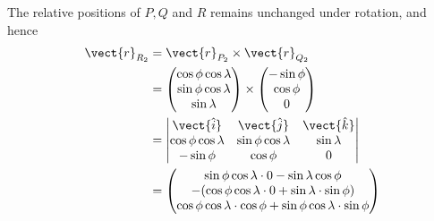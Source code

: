 \begin{enumerate}
          The relative positions of \(P, Q\) and \(R\) remains unchanged under rotation, and hence
          \begin{align*}
              \vect{r}_{R_2} & = \vect{r}_{P_2} \times \vect{r}_{Q_2}                                                                       \\
                             & = \begin{pmatrix}
                                     \cos \phi \cos \lambda \\
                                     \sin \phi \cos \lambda \\
                                     \sin \lambda
                                 \end{pmatrix} \times \begin{pmatrix}
                                                          - \sin \phi \\
                                                          \cos \phi   \\
                                                          0
                                                      \end{pmatrix}                                                                        \\
                             & = \begin{vmatrix}
                                     \vect{\hat{i}}         & \vect{\hat{j}}         & \vect{\hat{k}} \\
                                     \cos \phi \cos \lambda & \sin \phi \cos \lambda & \sin \lambda   \\
                                     - \sin \phi            & \cos \phi              & 0
                                 \end{vmatrix} \\
                             & = \begin{pmatrix}
                                     \sin \phi \cos \lambda \cdot 0 - \sin \lambda \cos \phi           \\
                                     - (\cos \phi \cos \lambda \cdot 0 + \sin \lambda \cdot \sin \phi) \\
                                     \cos \phi \cos \lambda \cdot \cos \phi + \sin \phi \cos \lambda \cdot \sin \phi
                                 \end{pmatrix}                             \\

\end{align*}
\end{enumerate}
